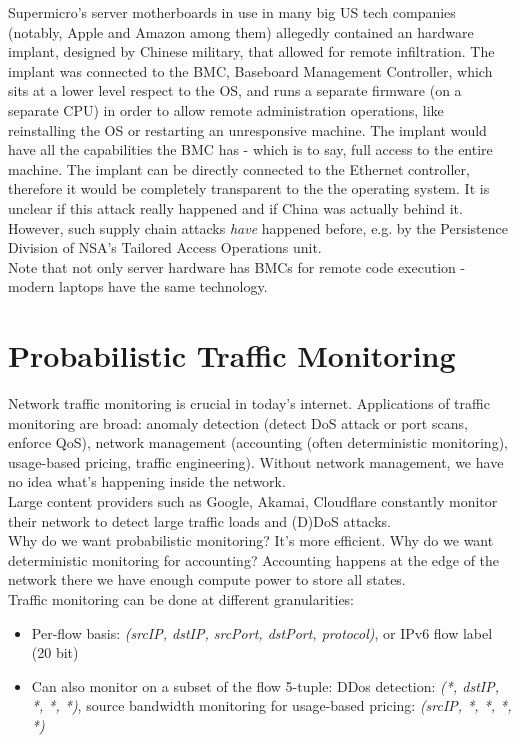 \documentclass[11pt,oneside,a4paper]{article}
\begin{document}
Supermicro’s server motherboards in use in many big US tech companies (notably, Apple and Amazon
among them) allegedly contained an hardware implant, designed by Chinese military, that allowed for remote infiltration. The implant was connected to the BMC, Baseboard Management Controller, which sits at a lower level respect to the OS, and runs a separate firmware (on a separate CPU) in order to allow remote administration operations, like reinstalling the OS or restarting an unresponsive machine. The implant would have all the capabilities the BMC has - which is to say, full access to the entire machine. The implant can be directly connected to the Ethernet controller, therefore it would be completely transparent to the the operating system. It is unclear if this attack really happened and if China was actually behind it. However, such supply chain attacks \textit{have} happened before, e.g. by the Persistence Division of NSA’s Tailored Access Operations unit.\\
Note that not only server hardware has BMCs for remote code execution - modern laptops have the same technology.

\section{Probabilistic Traffic Monitoring}

Network traffic monitoring is crucial in today's internet. Applications of traffic monitoring are broad: anomaly detection (detect DoS attack or port scans, enforce QoS), network management (accounting (often deterministic monitoring), usage-based pricing, traffic engineering). Without network management, we have no idea what's happening inside the network.\\
Large content providers such as Google, Akamai, Cloudflare constantly monitor their network to detect large traffic loads and (D)DoS attacks.\\
\noindent Why do we want probabilistic monitoring? It's more efficient.
\noindent Why do we want deterministic monitoring for accounting? Accounting happens at the edge of the network there we have enough compute power to store all states.\\

\noindent Traffic monitoring can be done at different granularities:

\vspace{-\topsep}
\begin{itemize}
	\setlength{\itemsep}{0pt}
	\setlength{\parskip}{0pt}
	\item Per-flow basis: \textit{(srcIP, dstIP, srcPort, dstPort, protocol)}, or IPv6 flow label (20 bit)
	\item Can also monitor on a subset of the flow 5-tuple: DDos detection: \textit{(*, dstIP, *, *, *)}, source bandwidth monitoring for usage-based pricing: \textit{(srcIP, *, *, *, *)}
\end{itemize}
\vspace{-\topsep}
\end{document}
